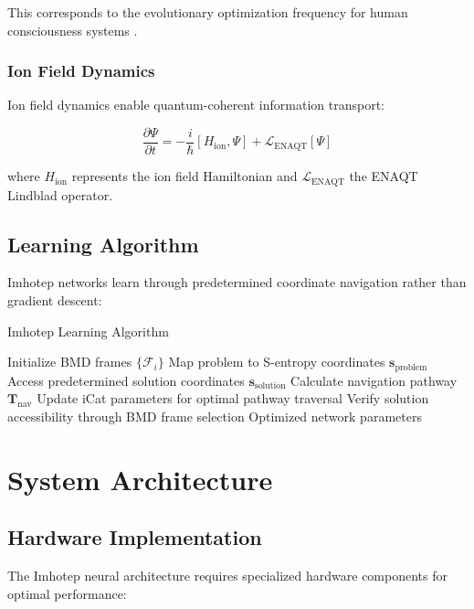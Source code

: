 \documentclass[12pt,a4paper]{article}
\theoremstyle{remark}
\begin{document}
This corresponds to the evolutionary optimization frequency for human consciousness systems \cite{sachikonye2024biooscillations}.

\subsubsection{Ion Field Dynamics}

Ion field dynamics enable quantum-coherent information transport:

\begin{equation}
\frac{\partial \Psi}{\partial t} = -\frac{i}{\hbar}[H_{\text{ion}}, \Psi] + \mathcal{L}_{\text{ENAQT}}[\Psi]
\end{equation}

where $H_{\text{ion}}$ represents the ion field Hamiltonian and $\mathcal{L}_{\text{ENAQT}}$ the ENAQT Lindblad operator.

\subsection{Learning Algorithm}

Imhotep networks learn through predetermined coordinate navigation rather than gradient descent:

\begin{algorithm}
\caption{Imhotep Learning Algorithm}
\begin{algorithmic}[1]
\STATE Initialize BMD frames $\{\mathcal{F}_i\}$
\STATE Map problem to S-entropy coordinates $\mathbf{s}_{\text{problem}}$
\STATE Access predetermined solution coordinates $\mathbf{s}_{\text{solution}}$
\STATE Calculate navigation pathway $\mathbf{T}_{\text{nav}}$
\STATE Update iCat parameters for optimal pathway traversal
\STATE Verify solution accessibility through BMD frame selection
\RETURN Optimized network parameters
\end{algorithmic}
\end{algorithm}

\section{System Architecture}

\subsection{Hardware Implementation}

The Imhotep neural architecture requires specialized hardware components for optimal performance:
\end{document}
